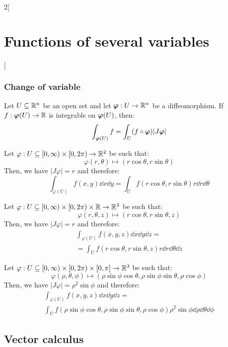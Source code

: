 \documentclass[../../../main_math.tex]{subfiles}
\begin{document}
\begin{multicols}{2}[\section{Functions of several variables}]
  \subsubsection{Change of variable}
  \begin{theorem}\label{FSV:changeofvariable}
    Let $U\subseteq\mathbb{R}^n$ be an open set and let $\boldsymbol{\mathrm{\varphi}}:U\rightarrow\mathbb{R}^n$ be a diffeomorphism. If $f:\boldsymbol{\mathrm{\varphi}}(U)\rightarrow\mathbb{R} $ is integrable on $\boldsymbol{\mathrm{\varphi}}(U)$, then: $$\int_{\boldsymbol{\mathrm{\varphi}}(U)} f=\int_U(f\circ\boldsymbol{\mathrm{\varphi}})|J\boldsymbol{\mathrm{\varphi}}|$$
  \end{theorem}
  \begin{corollary}
    Let $\varphi:U\subseteq[0,\infty)\times[0,2\pi)\rightarrow\mathbb{R}^2 $ be such that:
    $$\varphi(r,\theta)\longmapsto(r\cos\theta,r\sin\theta)$$
    Then, we have $|J\varphi|=r$ and therefore: $$\int_{\varphi(U)}f(x,y)\dd{x}\dd{y}=\int_Uf(r\cos\theta,r\sin\theta)r\dd{r} \dd{\theta}$$
  \end{corollary}
  \begin{corollary}
    Let $\varphi:U\subseteq[0,\infty)\times[0,2\pi)\times\mathbb{R} \rightarrow\mathbb{R}^3 $ be such that: $$\varphi(r,\theta,z)\longmapsto(r\cos\theta,r\sin\theta,z)$$
    Then, we have $|J\varphi|=r$ and therefore:
    \begin{multline*}
      \int_{\varphi(U)}f(x,y,z)\dd{x}\dd{y}\dd{z}=\\=\int_Uf(r\cos\theta,r\sin\theta,z)r\dd{r} \dd{\theta} \dd{z}
    \end{multline*}
  \end{corollary}
  \begin{corollary}
    Let $\varphi:U\subseteq[0,\infty)\times[0,2\pi)\times[0,\pi]\rightarrow\mathbb{R}^3 $ be such that: $$\varphi(\rho,\theta,\phi)\longmapsto(\rho\sin\phi\cos\theta,\rho\sin\phi\sin\theta,\rho\cos\phi)$$
    Then, we have $|J\varphi|=\rho^2\sin\phi$ and therefore:
    \begin{multline*}
      \int_{\varphi(U)}f(x,y,z)\dd{x}\dd{y}\dd{z}=\\\int_Uf(\rho\sin\phi\cos\theta,\rho\sin\phi\sin\theta,\rho\cos\phi)\rho^2\sin\phi \dd{\rho} \dd{\theta} \dd{\phi}
    \end{multline*}
  \end{corollary}
  \subsection{Vector calculus}

\end{multicols}
\end{document}
